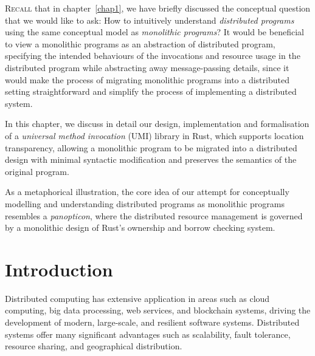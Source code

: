 \noindent
\begin{center}
\vspace{0.3em}
\vspace{-0.7em}
\end{center}
\lettrine{R}{ecall} that in chapter~\ref{chap1}, we have briefly discussed the conceptual question that we would like to ask: How to intuitively understand \emph{distributed programs} using the same conceptual model as \emph{monolithic programs}? It would be beneficial to view a monolithic programs as an abstraction of distributed program, specifying the intended behaviours of the invocations and resource usage in the distributed program while abstracting away message-passing details, since it would make the process of migrating monolithic programs into a distributed setting straightforward and simplify the process of implementing a distributed system.

In this chapter, we discuss in detail our design, implementation and formalisation of a \emph{universal method invocation} (UMI) library in Rust, which supports location transparency, allowing a monolithic program to be migrated into a distributed design with minimal syntactic modification and preserves the semantics of the original program.

As a metaphorical illustration, the core idea of our attempt for conceptually modelling and understanding distributed programs as monolithic programs resembles a \emph{panopticon}, where the distributed resource management is governed by a monolithic design of Rust's ownership and borrow checking system.

\section{Introduction}
\label{chap3:introduction}
Distributed computing has extensive application in areas such as cloud computing, big data processing, web services, and blockchain systems, driving the development of modern, large-scale, and resilient software systems. Distributed systems offer many significant advantages such as scalability, fault tolerance, resource sharing, and geographical distribution. 

